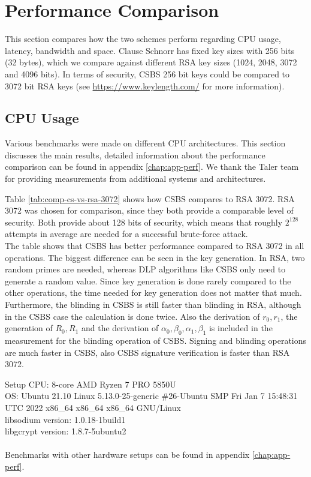 \section{Performance Comparison}
\label{sec:disc-perf-comp}
This section compares how the two schemes perform regarding CPU usage, latency, bandwidth and space.
Clause Schnorr has fixed key sizes with 256 bits (32 bytes), which we compare against different RSA key sizes (1024, 2048, 3072 and 4096 bits).
In terms of security, \gls{CSBS} 256 bit keys could be compared to 3072 bit RSA keys (see \url{https://www.keylength.com/} for more information).

\subsection{CPU Usage}  
Various benchmarks were made on different CPU architectures.
This section discusses the main results, detailed information about the performance comparison can be found in appendix \ref{chap:app-perf}.
We thank the Taler team for providing measurements from additional systems and architectures.

Table \ref{tab:comp-cs-vs-rsa-3072} shows how \gls{CSBS} compares to RSA 3072.
RSA 3072 was chosen for comparison, since they both provide a comparable level of security.
Both provide about 128 bits of security, which means that roughly $2^{128}$ attempts in average are needed for a successful brute-force attack.\\
The table shows that \gls{CSBS} has better performance compared to RSA 3072 in all operations.
The biggest difference can be seen in the key generation.
In RSA, two random primes are needed, whereas \ac{DLP} algorithms like \gls{CSBS} only need to generate a random value.
Since key generation is done rarely compared to the other operations, the time needed for key generation does not matter that much.\\
Furthermore, the blinding in \gls{CSBS} is still faster than blinding in RSA, although in the \gls{CSBS} case the calculation is done twice. Also the derivation of $r_0,r_1$, the generation of $R_0,R_1$ and the derivation of $\alpha_0, \beta_0, \alpha_1, \beta_1$ is included in the measurement for the blinding operation of \gls{CSBS}.
Signing and blinding operations are much faster in \gls{CSBS}, also \gls{CSBS} signature verification is faster than RSA 3072.

\begin{bfhBox}{Setup}
	CPU: 8-core AMD Ryzen 7 PRO 5850U \\
    OS: Ubuntu 21.10 Linux 5.13.0-25-generic \#26-Ubuntu SMP Fri Jan 7 15:48:31 UTC 2022 x86\_64 x86\_64 x86\_64 GNU/Linux \\
    libsodium version: 1.0.18-1build1 \\ 
    libgcrypt version: 1.8.7-5ubuntu2 \\\\
    Benchmarks with other hardware setups can be found in appendix \ref{chap:app-perf}.
\end{bfhBox}

